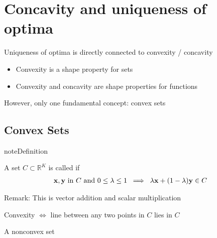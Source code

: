 \documentclass[letterpaper,10pt,english]{jupyterBook}
\begin{document}
\section{Concavity and uniqueness of optima}
\label{\detokenize{06.optimization_fundamentals:concavity-and-uniqueness-of-optima}}
\sphinxAtStartPar
Uniqueness of optima is directly connected to convexity / concavity
\begin{itemize}
\item {} 
\sphinxAtStartPar
Convexity is a shape property for sets

\item {} 
\sphinxAtStartPar
Convexity and concavity are shape properties for functions

\end{itemize}

\sphinxAtStartPar
However, only one fundamental concept: convex sets


\subsection{Convex Sets}
\label{\detokenize{06.optimization_fundamentals:convex-sets}}
\begin{sphinxadmonition}{note}{Definition}

\sphinxAtStartPar
A set \(C \subset \mathbb{R}^K\) is called  if
\begin{equation*}
\begin{split}
%
{\bf x}, {\bf y} \text{ in } C \text{ and } 0 \leq \lambda \leq 1
\; \implies \;
\lambda {\bf x} + (1 - \lambda) {\bf y} \in C
%
\end{split}
\end{equation*}\end{sphinxadmonition}

\sphinxAtStartPar
Remark: This is vector addition and scalar multiplication

\sphinxAtStartPar
Convexity \(\iff\) line between any two points in \(C\) lies in \(C\)

\begin{figure}[htbp]
\centering

\noindent{}
\end{figure}

\sphinxAtStartPar
A non\sphinxhyphen{}convex set

\begin{figure}[htbp]
\centering

\noindent{}
\end{figure}
\end{document}
